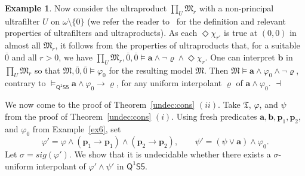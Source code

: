 \documentclass[10pt,a4paper]{amsart}
\theoremstyle{plain}
\theoremstyle{definition}
\newtheorem{exa}[thm]{Example}
\newcommand{\sig}{\mathit{sig}}
\newcommand{\tiling}{\mathfrak T}
\newcommand{\FOMS}{\ensuremath{\mathsf{Q^1S5}}}
\newcommand{\fform}[1]{\boldsymbol{#1}}
\newcommand{\pvar}{\fform{p}}
\newcommand{\avar}{\fform{a}}
\newcommand{\bvar}{\fform{b}}
\newcommand{\ovar}{\fform{o}}
\newcommand{\Bv}{\forall}
\newcommand{\Bh}{\Box}
\begin{document}
\begin{exa}
	Now consider the ultraproduct $\prod_{U}\mathfrak{M}_{r}$ with a non-principal ultrafilter $U$ on $\omega\setminus\{0\}$ (we refer the reader to~\cite{modeltheory} for the definition and relevant properties of ultrafilters and ultraproducts). As each $\Diamond \chi_{r'}$ is true at $(0,0)$ in almost all $\mathfrak{M}_{r}$, it follows from the properties of ultraproducts that, for a suitable $\overline{0}$ and all $r>0$, we have
$
\prod_{U}\mathfrak{M}_{r},\overline{0},\overline{0}\models \avar \land \neg \varrho \land \Diamond \chi_{r}.
$ 
One can interpret $\bvar$ in $\prod_{U}\mathfrak{M}_{r}$ so that  
	$\mathfrak{M},\overline{0},\overline{0}\models \varphi_{0}$ for the resulting model $\mathfrak{M}$. Then $\mathfrak{M}\models \avar \wedge \varphi_{0} \wedge \neg \varrho$, contrary to $\models_\FOMS\avar\land\varphi_0\to\varrho$, for any uniform interpolant $\varrho$ of $\avar\land\varphi_0$. \hfill $\dashv$
\end{exa}

We now come to the proof of Theorem~\ref{undec:cons} $(ii)$.
	Take $\tiling$, $\varphi$, and $\psi$ from the proof of Theorem~\ref{undec:cons} $(i)$. Using fresh predicates $\avar, \bvar, \pvar_{1},\pvar_{2}$, and $\varphi_{0}$ from Example~\ref{ex6},  set
		$$
		\varphi' =  \varphi\land (\pvar_{1}\rightarrow \pvar_{1})\land (\pvar_{2}\rightarrow \pvar_{2}),\qquad
		\psi' =  (\psi \vee \avar) \wedge \varphi_{0}.
		$$
		Let $\sigma= \sig(\varphi')$. 
		We show that it is undecidable whether there exists a $\sigma$-uniform interpolant of $\varphi' \wedge \psi'$ in $\FOMS$.
		
\end{document}
